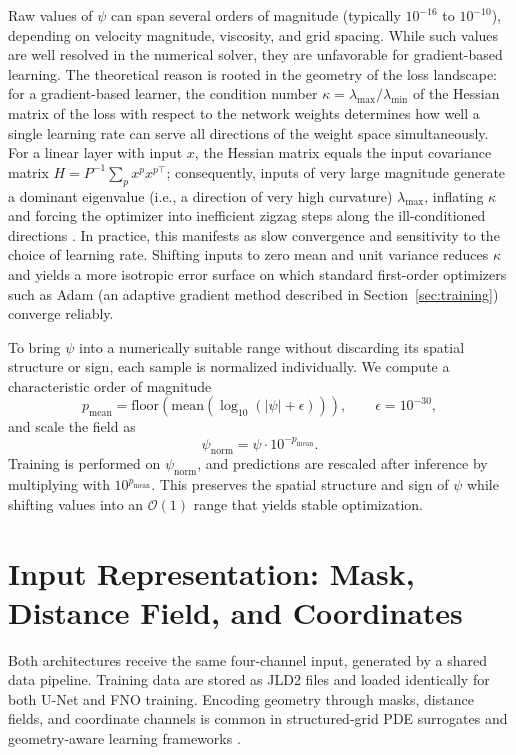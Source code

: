 Raw values of $\psi$ can span several orders of magnitude (typically $10^{-16}$ to $10^{-10}$), depending on velocity magnitude, viscosity, and grid spacing. While such values are well resolved in the numerical solver, they are unfavorable for gradient-based learning. The theoretical reason is rooted in the geometry of the loss landscape: for a gradient-based learner, the condition number $\kappa = \lambda_{\max}/\lambda_{\min}$ of the Hessian matrix of the loss with respect to the network weights determines how well a single learning rate can serve all directions of the weight space simultaneously. For a linear layer with input $x$, the Hessian matrix equals the input covariance matrix $H = P^{-1}\sum_p x^p x^{p\top}$; consequently, inputs of very large magnitude generate a dominant eigenvalue (i.e., a direction of very high curvature) $\lambda_{\max}$, inflating $\kappa$ and forcing the optimizer into inefficient zigzag steps along the ill-conditioned directions \parencite{LeCun2012}. In practice, this manifests as slow convergence and sensitivity to the choice of learning rate. Shifting inputs to zero mean and unit variance reduces $\kappa$ and yields a more isotropic error surface on which standard first-order optimizers such as Adam (an adaptive gradient method described in Section~\ref{sec:training}) converge reliably.

To bring $\psi$ into a numerically suitable range without discarding its spatial structure or sign, each sample is normalized individually. We compute a characteristic order of magnitude
\[
p_{\mathrm{mean}}=
\mathrm{floor}\!\left(
\mathrm{mean}\left(\log_{10}(|\psi|+\epsilon)\right)
\right),
\qquad \epsilon=10^{-30},
\]
and scale the field as
\[
\psi_{\mathrm{norm}}=\psi\cdot 10^{-p_{\mathrm{mean}}}.
\]
Training is performed on $\psi_{\mathrm{norm}}$, and predictions are rescaled after inference by multiplying with $10^{p_{\mathrm{mean}}}$. This preserves the spatial structure and sign of $\psi$ while shifting values into an $\mathcal{O}(1)$ range that yields stable optimization.

\section{Input Representation: Mask, Distance Field, and Coordinates}
\label{sec:input_channels}

Both architectures receive the same four-channel input, generated by a shared data pipeline. Training data are stored as JLD2 files and loaded identically for both U-Net and FNO training. Encoding geometry through masks, distance fields, and coordinate channels is common in structured-grid PDE surrogates and geometry-aware learning frameworks \parencite{thuerey_deep_2020,oldenburg_geometry_2022}.

